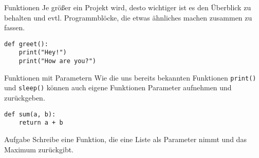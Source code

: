 \begin{frame}[fragile]{Funktionen}
Je größer ein Projekt wird, desto wichtiger ist es den Überblick zu behalten
und evtl. Programmblöcke, die etwas ähnliches machen zusammen zu fassen.

\begin{lstlisting}
def greet():
    print("Hey!")
    print("How are you?")
\end{lstlisting}
\end{frame}

\begin{frame}[fragile]{Funktionen mit Parametern}
Wie die uns bereits bekannten Funktionen \lstinline{print()} und \lstinline{sleep()}
können auch eigene Funktionen Parameter aufnehmen und zurückgeben.

\begin{lstlisting}
def sum(a, b):
    return a + b
\end{lstlisting}

\begin{block}{Aufgabe}
Schreibe eine Funktion, die eine Liste als Parameter nimmt und das Maximum 
zurückgibt.
\end{block}
\end{frame}
